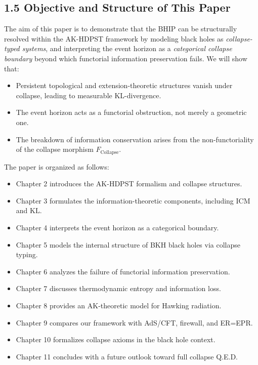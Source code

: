 \documentclass[11pt]{article}
\begin{document}
\subsection*{1.5 Objective and Structure of This Paper}

The aim of this paper is to demonstrate that the BHIP can be structurally resolved within the AK-HDPST framework by modeling black holes as \textit{collapse-typed systems}, and interpreting the event horizon as a \textit{categorical collapse boundary} beyond which functorial information preservation fails. We will show that:

\begin{itemize}
    \item Persistent topological and extension-theoretic structures vanish under collapse, leading to measurable KL-divergence.
    \item The event horizon acts as a functorial obstruction, not merely a geometric one.
    \item The breakdown of information conservation arises from the non-functoriality of the collapse morphism \(F_{\mathrm{Collapse}}\).
\end{itemize}

The paper is organized as follows:

\begin{itemize}
    \item Chapter 2 introduces the AK-HDPST formalism and collapse structures.
    \item Chapter 3 formulates the information-theoretic components, including \(\mathrm{ICM}\) and \(\mathrm{KL}\).
    \item Chapter 4 interprets the event horizon as a categorical boundary.
    \item Chapter 5 models the internal structure of BKH black holes via collapse typing.
    \item Chapter 6 analyzes the failure of functorial information preservation.
    \item Chapter 7 discusses thermodynamic entropy and information loss.
    \item Chapter 8 provides an AK-theoretic model for Hawking radiation.
    \item Chapter 9 compares our framework with AdS/CFT, firewall, and ER=EPR.
    \item Chapter 10 formalizes collapse axioms in the black hole context.
    \item Chapter 11 concludes with a future outlook toward full collapse Q.E.D.
\end{itemize}
\end{document}
